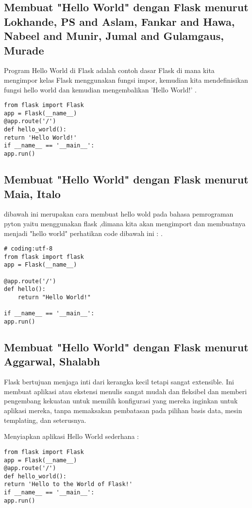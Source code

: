 \documentclass[12pt]{article}
\begin{document}
\subsection{Membuat "Hello World" dengan Flask menurut Lokhande, PS and Aslam, Fankar and Hawa, Nabeel and Munir, Jumal and Gulamgaus, Murade}
Program Hello World di Flask adalah contoh dasar Flask di mana kita mengimpor kelas Flask menggunakan fungsi impor, kemudian kita mendefinisikan fungsi hello world dan kemudian mengembalikan 'Hello World!' \cite{lokhande2015efficient}.
\begin{verbatim}
from flask import Flask
app = Flask(__name__)
@app.route('/')
def hello_world():
return 'Hello World!'
if __name__ == '__main__':
app.run()
\end{verbatim}

\subsection{Membuat "Hello World" dengan Flask menurut Maia, Italo}
dibawah ini merupakan cara membuat hello wold pada bahasa pemrograman pyton yaitu menggunakan flask ,dimana kita akan mengimport dan membuatnya menjadi "hello world" perhatikan code dibawah ini :
\cite{maia2015building}.
\begin{verbatim}
# coding:utf-8
from flask import flask 
app = Flask(__name__)

@app.route('/')
def hello():
	return "Hello World!"
	
if __name__ == '__main__':
app.run()
\end{verbatim}

\subsection{Membuat "Hello World" dengan Flask menurut Aggarwal, Shalabh }
Flask bertujuan menjaga inti dari kerangka kecil tetapi sangat extensible. Ini membuat aplikasi atau ekstensi menulis sangat mudah dan fleksibel dan memberi pengembang kekuatan untuk memilih konfigurasi yang mereka inginkan untuk aplikasi mereka, tanpa memaksakan pembatasan pada pilihan basis data, mesin templating, dan seterusnya\cite{aggarwal2014flask}.

Menyiapkan aplikasi Hello World sederhana :
\begin{verbatim}
from flask import Flask
app = Flask(__name__)
@app.route('/')
def hello_world():
return 'Hello to the World of Flask!'
if __name__ == '__main__':
app.run()
\end{verbatim}
\end{document}
